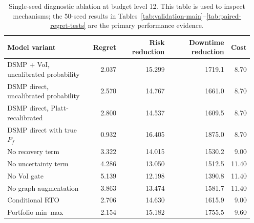\begin{table}[t]
\centering
\scriptsize
\caption{Single-seed diagnostic ablation at budget level 12. This table is used to inspect mechanisms; the 50-seed results in Tables~\ref{tab:validation-main}--\ref{tab:paired-regret-tests} are the primary performance evidence.}
\label{tab:validation-ablation}
\begin{tabular*}{\textwidth}{@{\extracolsep{\fill}}p{}rrrr}
\toprule
Model variant & Regret & Risk reduction & Downtime reduction & Cost \\
\midrule
DSMP + VoI, uncalibrated probability & 2.037 & 15.299 & 1719.1 & 8.70 \\
DSMP direct, uncalibrated probability & 2.570 & 14.767 & 1661.0 & 8.70 \\
DSMP direct, Platt-recalibrated & 2.800 & 14.537 & 1609.5 & 8.70 \\
DSMP direct with true $P_f$ & 0.932 & 16.405 & 1875.0 & 8.70 \\
No recovery term & 3.322 & 14.015 & 1530.2 & 9.00 \\
No uncertainty term & 4.286 & 13.050 & 1512.5 & 11.40 \\
No VoI gate & 5.139 & 12.198 & 1390.8 & 11.40 \\
No graph augmentation & 3.863 & 13.474 & 1581.7 & 11.40 \\
Conditional RTO & 2.706 & 14.630 & 1615.9 & 9.00 \\
Portfolio min--max & 2.154 & 15.182 & 1755.5 & 9.60 \\
\bottomrule
\end{tabular*}
\end{table}

